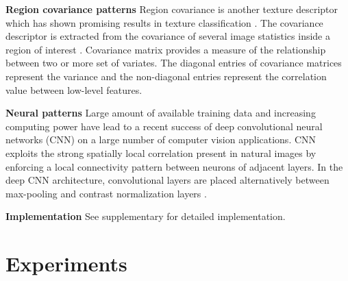\documentclass[10pt,twocolumn,letterpaper]{article}
\renewcommand{\paragraph}{\textbf}
\begin{document}
\paragraph{Region covariance patterns}
Region covariance is another texture descriptor which has
shown promising results in texture classification \cite{Tuzel2006Region}.
The covariance descriptor is extracted from the covariance
of several image statistics inside a region of interest \cite{Tuzel2006Region}.
Covariance matrix provides a measure of the relationship between
two or more set of variates.
The diagonal entries of covariance matrices represent the variance
and the non-diagonal entries represent the correlation value
between low-level features.




\paragraph{Neural patterns}
Large amount of available training data and
increasing computing power have lead to
a recent success of deep
convolutional neural networks (CNN)
on a large number of computer vision applications.
CNN exploits the strong spatially local correlation present in
natural images by enforcing a local connectivity pattern
between neurons of adjacent layers.
In the deep CNN architecture, convolutional layers are placed
alternatively between max-pooling and contrast
normalization layers \cite{Krizhevsky2012Imagenet}.


\paragraph{Implementation}
See supplementary for detailed implementation.

\section{Experiments}
\end{document}
